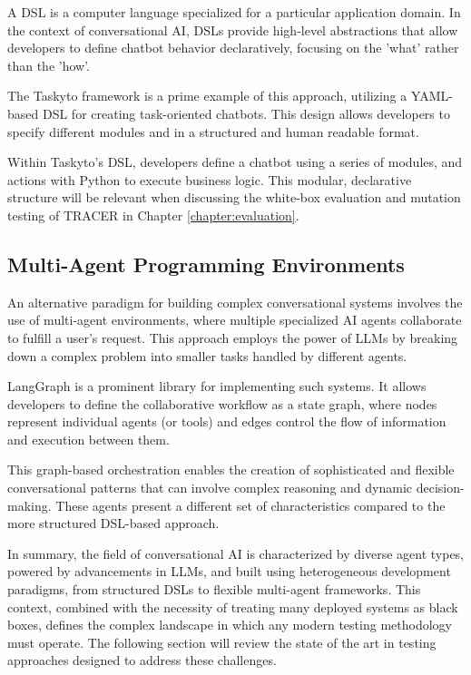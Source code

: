 A \acl{DSL} is a computer language
specialized for a particular application domain.
In the context of conversational AI,
\acp{DSL} provide high-level abstractions
that allow developers to define chatbot behavior declaratively,
focusing on the 'what' rather than the 'how'.

The Taskyto framework \autocite{sanchezcuadradoAutomatingDevelopmentTaskoriented2024} is a prime example of this approach,
utilizing a YAML-based \ac{DSL} for creating task-oriented chatbots.
This design allows developers to specify
different modules and in a structured and human readable format.

Within Taskyto's \ac{DSL}, developers define a chatbot using a series of modules,
and actions with Python to execute business logic.
This modular, declarative structure
will be relevant when discussing the white-box evaluation and mutation testing of \ac{TRACER} in Chapter \ref{chapter:evaluation}.

\subsection{Multi-Agent Programming Environments}

An alternative paradigm for building complex conversational systems
involves the use of multi-agent environments,
where multiple specialized \ac{AI} agents collaborate to fulfill a user's request.
This approach employs the power of \acp{LLM}
by breaking down a complex problem into smaller tasks handled by different agents.

LangGraph \autocite{LangGraph} is a prominent library for implementing such systems.
It allows developers to define the collaborative workflow as a state graph,
where nodes represent individual agents (or tools)
and edges control the flow of information and execution between them.

This graph-based orchestration enables the creation of
sophisticated and flexible conversational patterns
that can involve complex reasoning and dynamic decision-making.
These agents present a different set of characteristics
compared to the more structured \ac{DSL}-based approach.

\indent

In summary,
the field of conversational \ac{AI} is characterized by diverse agent types,
powered by advancements in \acp{LLM},
and built using heterogeneous development paradigms,
from structured \acp{DSL} to flexible multi-agent frameworks.
This context, combined with the necessity of treating many deployed systems as black boxes,
defines the complex landscape in which any modern testing methodology must operate.
The following section will review the state of the art in testing approaches designed to address these challenges.

